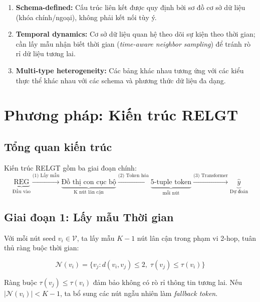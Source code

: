 \documentclass[12pt,a4paper]{article}
\begin{document}
\begin{enumerate}
  \item \textbf{Schema-defined:} Cấu trúc liên kết được quy định bởi sơ đồ 
        cơ sở dữ liệu (khóa chính/ngoại), không phải kết nối tùy ý.
  \item \textbf{Temporal dynamics:} Cơ sở dữ liệu quan hệ theo dõi sự kiện 
        theo thời gian; cần lấy mẫu nhận biết thời gian 
        (\emph{time-aware neighbor sampling}) để tránh rò rỉ dữ liệu tương lai.
  \item \textbf{Multi-type heterogeneity:} Các bảng khác nhau tương ứng với 
        các kiểu thực thể khác nhau với các schema và phương thức dữ liệu đa dạng.
\end{enumerate}

\section{Phương pháp: Kiến trúc RELGT}

\subsection{Tổng quan kiến trúc}

Kiến trúc RELGT gồm ba giai đoạn chính:
\[
  \underbrace{\text{REG}}_{\text{Đầu vào}}
  \xrightarrow{\text{(1) Lấy mẫu}} 
  \underbrace{\text{Đồ thị con cục bộ}}_{\text{K nút lân cận}}
  \xrightarrow{\text{(2) Token hóa}}
  \underbrace{\text{5-tuple token}}_{\text{mỗi nút}}
  \xrightarrow{\text{(3) Transformer}}
  \underbrace{\hat{y}}_{\text{Dự đoán}}
\]

\subsection{Giai đoạn 1: Lấy mẫu Thời gian}

Với mỗi nút seed $v_i \in \mathcal{V}$, ta lấy mẫu $K-1$ nút lân cận
trong phạm vi 2-hop, tuân thủ ràng buộc thời gian:

\begin{equation}
  \mathcal{N}(v_i) = \bigl\{v_j : d(v_i, v_j) \le 2,\; \tau(v_j) \le \tau(v_i)\bigr\}
\end{equation}

Ràng buộc $\tau(v_j) \le \tau(v_i)$ đảm bảo không có rò rỉ thông tin tương lai.
Nếu $|\mathcal{N}(v_i)| < K-1$, ta bổ sung các nút ngẫu nhiên làm \emph{fallback token}.
\end{document}
